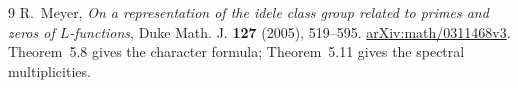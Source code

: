 \begin{thebibliography}{9}
R.~Meyer, \emph{On a representation of the idele class group related
to primes and zeros of $L$-functions}, Duke Math. J. \textbf{127}
(2005), 519--595. \href{https://arxiv.org/abs/math/0311468v3}
{arXiv:math/0311468v3}. Theorem~5.8 gives the character formula;
Theorem~5.11 gives the spectral multiplicities.
\end{thebibliography}
